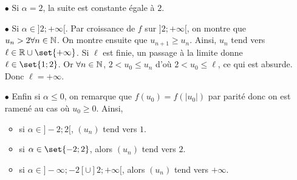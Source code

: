 \documentclass{magnoliaold}
\begin{document}
\begin{exos}
\begin{sol}
\begin{itemize}
\item[$\bullet$] Si $\alpha=2$, la suite est constante égale à $2$.

\item[$\bullet$] Si $\alpha \in ]2;+\infty[$. Par croissance de $f$ sur $]2;+\infty[$, on montre que $u_n>2 \forall n \in \mathbb{N}$. On montre ensuite que $u_{n+1}\geq u_n$. Ainsi, $u_n$ tend vers $\ell \in \R\cup\set{+\infty}$. Si $\ell$ est finie, un passage à la limite donne $\ell \in \set{1;2}$. Or $\forall n \in \mathbb{N}$, $2<u_0\leq u_n$ d'où $2<u_0\leq \ell$, ce qui est absurde. Donc $\ell=+\infty$.

\item[$\bullet$] Enfin si $\alpha \leq 0$, on remarque que $f(u_0)=f(|u_0|)$ par parité donc on est ramené au cas où $u_0\geq 0$. Ainsi,
\begin{itemize}
\item si $\alpha \in ]-2;2[$, $(u_n)$ tend vers $1$.
\item si $\alpha \in \set{-2;2}$, alors $(u_n)$ tend vers $2$.
\item si $\alpha \in ]-\infty;-2[\cup ]2;+\infty[$, alors $(u_n)$ tend vers $+\infty$.
\end{itemize}
\end{itemize}
\end{sol}
\end{exos}
\end{document}
